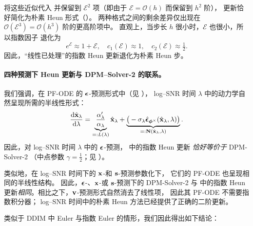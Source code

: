 将这些近似代入  并保留到 $\mathcal{E}^2$ 项（即由于 $\mathcal{E}=\mathcal{O}(h)$ 而保留到 $h^2$ 阶），
更新恰好简化为朴素 Heun 形式（）。
两种格式之间的剩余差异仅出现在 $\mathcal{O}(\mathcal{E}^3)=\mathcal{O}(h^3)$ 阶的更高阶项中。
直观上，当步长 $h$ 很小时，$\mathcal{E}$ 也很小，所以指数因子
退化为
\[
e^{\mathcal{E}} \approx 1+\mathcal{E},\quad 
c_1(\mathcal{E}) \approx 1,\quad c_2(\mathcal{E}) \approx \tfrac{1}{2}.
\]
因此，“线性已处理”的指数 Heun 更新退化为朴素 Heun 步。

\paragraph{四种预测下 Heun 更新与 DPM--Solver-2 的联系。}
我们强调，在 PF-ODE 的 ${\bm{\epsilon}}$-预测形式中（见 ），
log--SNR 时间 $\lambda$ 中的动力学自然呈现所需的半线性形式：
\[
\frac{\mathop{}\!\mathrm{d} \hat{{\mathbf{x}}}_\lambda}{\mathop{}\!\mathrm{d} \lambda}
= \underbrace{\frac{\alpha_\lambda'}{\alpha_\lambda}}_{=:L(\lambda)} \hat{{\mathbf{x}}}_\lambda
+
\underbrace{\big(- \sigma_\lambda \hat{\bm{\epsilon}}_{\bm{\phi}^\times}(\hat{{\mathbf{x}}}_\lambda,\lambda)\big)}_{=:{\mathbf{N}}(\hat{{\mathbf{x}}}_\lambda,\lambda)}.
\]
因此，对 log--SNR 时间 $\lambda$ 中的 ${\bm{\epsilon}}$-预测， 中的指数 Heun 更新
\emph{恰好等价于} DPM-Solver-2
（中点参数 $\gamma=\tfrac{1}{2}$；见 ）。

类似地，在 log--SNR 时间下的 ${\mathbf{x}}$-和 ${\mathbf{s}}$-预测参数化下，
它们的 PF-ODE 也呈现相同的半线性结构。
因此，${\bm{\epsilon}}$-、${\mathbf{x}}$-或 ${\mathbf{s}}$-预测下的 DPM-Solver-2
与  中的指数 Heun 更新\emph{相同}。相比之下，${\mathbf{v}}$-预测形式自然消去了线性项，
因此其 PF-ODE 不需要指数积分器；
log--SNR 时间中的朴素 Heun 方法已经提供了正确的二阶更新。

类似于 DDIM 中 Euler 与指数 Euler 的情形，我们因此得出如下结论： 





\clearpage
\newpage

